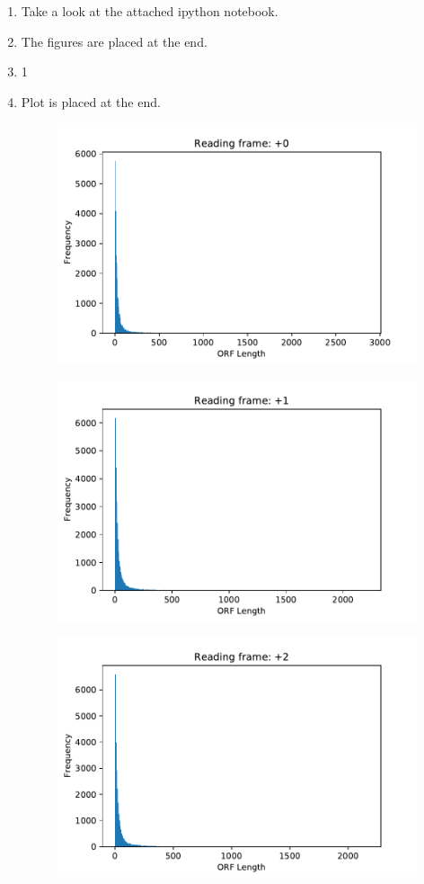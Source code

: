 \documentclass[a4paper]{article}
\begin{document}
\begin{enumerate}[label=(\alph*)]
    \item Take a look at the attached ipython notebook.
    \item The figures are placed at the end. 
    \item 1
    \item Plot is placed at the end.
    \pagebreak

    \begin{figure}
        \includegraphics{q5f0.pdf}
    \end{figure}
    \begin{figure}
        \includegraphics{q5f1.pdf}
    \end{figure}
    \begin{figure}
        \includegraphics{q5f2.pdf}

\end{figure}
\end{enumerate}
\end{document}
